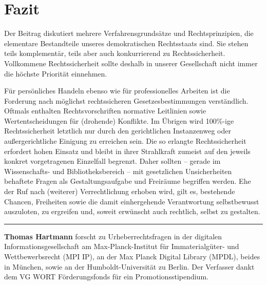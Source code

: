 \documentclass[output=paper]{langscibook}
\begin{document}
\hypertarget{fazit}{%
\section{Fazit}\label{fazit}}

Der Beitrag diskutiert mehrere Verfahrensgrundsätze und
Rechtsprinzipien, die elementare Bestandteile unseres demokratischen
Rechtsstaats sind. Sie stehen teils komplementär, teils aber auch
konkurrierend zu Rechtssicherheit. Vollkommene Rechtssicherheit sollte
deshalb in unserer Gesellschaft nicht immer die höchste Priorität
einnehmen.

Für persönliches Handeln ebenso wie für professionelles Arbeiten ist die
Forderung nach möglichst rechtssicheren Gesetzesbestimmungen
verständlich. Oftmals enthalten Rechtsvorschriften normative Leitlinien
sowie Wertentscheidungen für (drohende) Konflikte. Im Übrigen wird
100\%-ige Rechtssicherheit letztlich nur durch den gerichtlichen
Instanzenweg oder außergerichtliche Einigung zu erreichen sein. Die so
erlangte Rechtssicherheit erfordert hohen Einsatz und bleibt in ihrer
Strahlkraft zumeist auf den jeweils konkret vorgetragenen Einzelfall
begrenzt. Daher sollten -- gerade im Wissenschafts- und
Bibliotheksbereich -- mit gesetzlichen Unsicherheiten behaftete Fragen
als Gestaltungsaufgabe und Freiräume begriffen werden. Ehe der Ruf nach
(weiterer) Verrechtlichung erhoben wird, gilt es, bestehende Chancen,
Freiheiten sowie die damit einhergehende Verantwortung selbstbewusst
auszuloten, zu ergreifen und, soweit erwünscht auch rechtlich, selbst zu
gestalten.

\begin{center}\rule{0.5\linewidth}{0.5pt}\end{center}


\textbf{Thomas Hartmann} forscht zu Urheberrechtsfragen in der digitalen
Informationsgesellschaft am Max-Planck-Institut für Immaterialgüter- und
Wettbewerbsrecht (MPI IP), an der Max Planck Digital Library (MPDL),
beides in München, sowie an der Humboldt-Universität zu Berlin. Der
Verfasser dankt dem VG WORT Förderungsfonds für ein
Promotionsstipendium.

\end{document}

